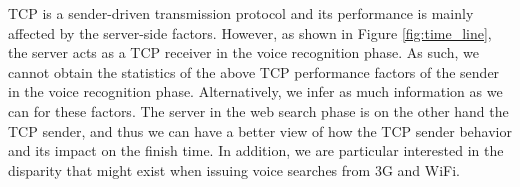 TCP is a sender-driven transmission protocol and its performance is mainly affected by the server-side factors. However, as shown in Figure \ref{fig:time_line}, the server acts as a TCP receiver in the voice recognition phase. As such, we cannot obtain the statistics of the above TCP performance factors of the sender in the voice recognition phase. Alternatively, we infer as much information as we can for these factors. The server in the web search phase is on the other hand the TCP sender, and thus we can have a better view of how the TCP sender behavior and its impact on the finish time. In addition, we are particular interested in the disparity that might exist when issuing voice searches from 3G and WiFi. 
